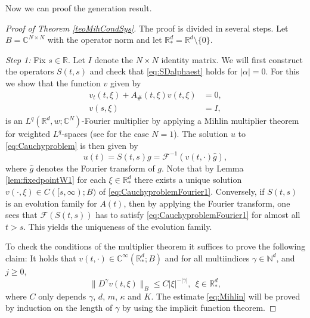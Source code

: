 \documentclass{amsart}
\theoremstyle{plain}
\theoremstyle{remark}
\theoremstyle{plain}
\numberwithin{equation}{section}
\begin{document}
Now we can proof the generation result.
\begin{proof}[Proof of Theorem \ref{teoMihCondSys}]
The proof is divided in several steps. Let $B = { \mathbb{C} }^{N\times N}$ with the operator norm and let ${ \mathbb{R} }^d_* = { \mathbb{R} }^d\setminus \{0\}$.

\medskip

{\em Step 1:} Fix $s\in { \mathbb{R} }$. Let $I$ denote the $N\times N$ identity matrix.  We will first construct the operators $S(t,s)$ and check that \eqref{eq:SDalphaest} holds for $|\alpha|=0$.
For this we show that the function $v$ given by
\begin{equation}\label{eq:CauchyproblemFourier1}
\begin{aligned}
  v_t(t,\xi) + A_{\#}(t,\xi) v(t,\xi) & = 0,
 \\ v(s,\xi) &= I,
\end{aligned}
\end{equation}
is an $L^q({ \mathbb{R} }^d,w;{ \mathbb{C} }^{N})$-Fourier multiplier by applying a Mihlin multiplier theorem for weighted $L^q$-spaces (see \cite[Theorem IV.3.9]{GarciaRubio} for the case $N=1$). The solution $u$ to \eqref{eq:Cauchyproblem} is then given by
\[u(t) = S(t,s) g = { \mathcal{F} }^{-1}(v(t,\cdot) \hat{g}),\]
where $\hat{g}$ denotes the Fourier transform of $g$. Note that by Lemma \ref{lem:fixedpointW1} for each $\xi\in { \mathbb{R} }^d_*$ there exists a unique solution $v(\cdot, \xi)\in C([s,\infty);B)$ of \eqref{eq:CauchyproblemFourier1}.
Conversely, if $S(t,s)$ is an evolution family for $A(t)$, then by applying the Fourier transform, one sees that ${ \mathcal{F} }(S(t,s))$ has to satisfy \eqref{eq:CauchyproblemFourier1} for almost all $t>s$. This yields the uniqueness of the evolution family.

To check the conditions of the multiplier theorem it suffices to prove the following claim: It holds that $v(t, \cdot)\in { \mathbb{C} }^\infty({ \mathbb{R} }^d_*;B)$ and for all multiindices $\gamma\in { \mathbb{N} }^d$, and $j\geq 0$,
\begin{equation}\label{eq:Mihlin}
\|D^{\gamma} v(t,\xi)\|_{B} \leq C |\xi|^{-|\gamma|}, \ \ \xi\in { \mathbb{R} }^d_*,
\end{equation}
where $C$ only depends $\gamma$, $d$, $m$, $\kappa$ and $K$.
The estimate \eqref{eq:Mihlin} will be proved by induction on the length of $\gamma$ by using the implicit function theorem.


\end{proof}
\end{document}
